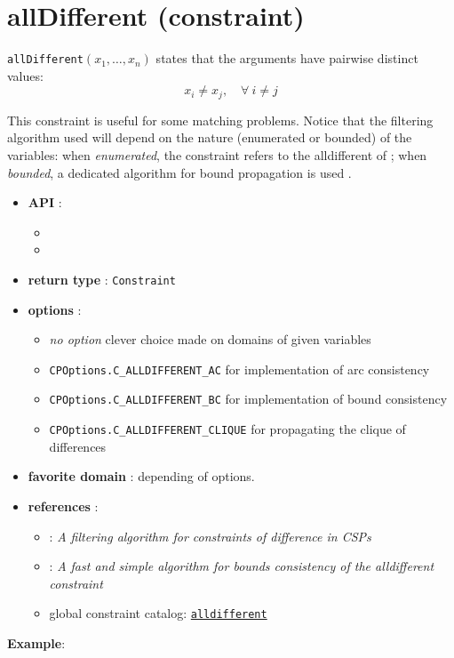 \label{alldifferent}
\hypertarget{alldifferent}{}

\section{allDifferent (constraint)}\label{alldifferent:alldifferentconstraint}\hypertarget{alldifferent:alldifferentconstraint}{}
\begin{notedef}
  \texttt{allDifferent}$(x_1,\ldots,x_n)$ states that the arguments have pairwise distinct values:
 $$x_i \neq x_j,\quad \forall\ i\neq j$$  
\end{notedef}
This constraint is useful for some matching problems.
Notice that the filtering algorithm used will depend on the nature (enumerated or bounded) of the variables: 
when \emph{enumerated}, the constraint refers to the alldifferent of \cite{ReginAAAI94};
when \emph{bounded}, a dedicated algorithm for bound propagation is used \cite{LopezIJCAI03}.

\begin{itemize}
	\item \textbf{API} :
	\begin{itemize}
		\item {}
		\item {}
	\end{itemize}
	\item \textbf{return type} : \texttt{Constraint}
	\item \textbf{options} :
	\begin{itemize}
		\item \emph{no option} clever choice made on domains of given variables
		\item \texttt{CPOptions.C_ALLDIFFERENT_AC} for \cite{ReginAAAI94} implementation of arc consistency
		\item \texttt{CPOptions.C_ALLDIFFERENT_BC} for \cite{LopezIJCAI03} implementation of bound consistency
		\item \texttt{CPOptions.C_ALLDIFFERENT_CLIQUE} for propagating the clique of differences
	\end{itemize}
	\item \textbf{favorite domain} : depending of options.
	\item \textbf{references} :
      \begin{itemize}
      \item  \cite{ReginAAAI94}: \emph{A filtering algorithm for constraints of difference in CSPs}
      \item  \cite{LopezIJCAI03}: \emph{A fast and simple algorithm for bounds consistency of the alldifferent constraint}
      \item global constraint catalog: \href{http://www.emn.fr/x-info/sdemasse/gccat/Calldifferent.html}{\tt alldifferent}
      \end{itemize}
\end{itemize}



\textbf{Example}:

